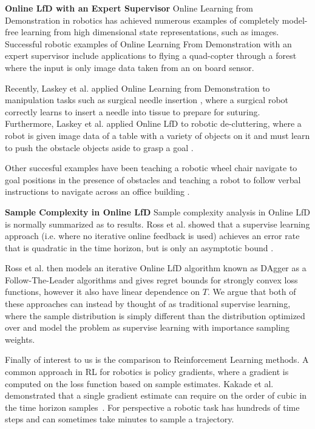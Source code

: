 \documentclass[10pt, conference]{ieeeconf}      %
\begin{document}
\noindent \textbf{Online LfD with an Expert Supervisor}
Online Learning from Demonstration in robotics has achieved numerous examples of completely model-free learning from high dimensional state representations, such as images. Successful robotic examples of Online Learning From Demonstration with an expert supervisor include applications to flying a quad-copter through a forest where the input is only image data taken from an on board sensor. 

Recently, Laskey et al. applied Online Learning from Demonstration to manipulation tasks such as surgical needle insertion \cite{laskeyshiv}, where a surgical robot correctly learns to insert a needle into tissue to prepare for suturing. Furthermore, Laskey et al. applied Online LfD to robotic de-cluttering, where a robot is given image data of a table with a variety of objects on it and must learn to push the obstacle objects aside to grasp a goal \cite{laskeyrobot}. 

Other succesful examples have been teaching a robotic wheel chair navigate to goal positions in the presence of obstacles and teaching a robot to follow verbal instructions to navigate across an office building \cite{kim2013maximum, duvallet2013imitation}. 

\noindent \textbf{Sample Complexity in Online LfD}
Sample complexity analysis in Online LfD is normally summarized as to results.  Ross et al. showed that a supervise learning approach (i.e. where no iterative online feedback is used) achieves an error rate that is quadratic in the time horizon, but is only an asymptotic bound \cite{ross2010efficient}. 

Ross et al. then models an iterative Online LfD algorithm known as DAgger as a Follow-The-Leader algorithms and gives regret bounds for strongly convex loss functions, however it also have linear dependence on $T$. We argue that both of these approaches can instead by thought of as traditional supervise learning, where the sample distribution is simply different than the distribution optimized over and model the problem as supervise learning with importance sampling weights. 

Finally of interest to us is the comparison to Reinforcement Learning methods. A common approach in RL for robotics is policy gradients, where a gradient is computed on the loss function based on sample estimates. Kakade et al. demonstrated that  a single gradient estimate can require on the order of cubic in the time horizon samples~\cite{kakade2003sample}. For perspective a robotic task has hundreds of time steps and can sometimes take minutes to sample a trajectory.
\end{document}
